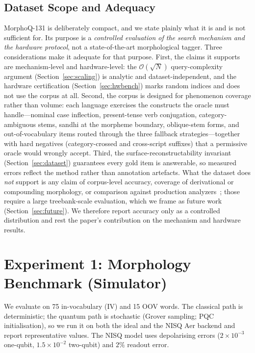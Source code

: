 \documentclass[journal]{IEEEtran}
\newcommand{\bigO}{\mathcal{O}}
\newcommand{\sqrtN}{\sqrt{N}}
\begin{document}
\subsection{Dataset Scope and Adequacy}
\label{sec:adequacy}
MorphoQ-131 is deliberately compact, and we state plainly what it is and is not
sufficient for. Its purpose is a \emph{controlled evaluation of the search
mechanism and the hardware protocol}, not a state-of-the-art morphological
tagger. Three considerations make it adequate for that purpose.
First, the claims it supports are mechanism-level and hardware-level: the
$\bigO(\sqrtN)$ query-complexity argument (Section~\ref{sec:scaling}) is
analytic and dataset-independent, and the hardware certification
(Section~\ref{sec:hwbench}) marks random indices and does not use the corpus at
all. Second, the corpus is designed for phenomenon coverage rather than volume:
each language exercises the constructs the oracle must handle---nominal case
inflection, present-tense verb conjugation, category-ambiguous stems, sandhi at
the morpheme boundary, oblique-stem forms, and out-of-vocabulary items routed
through the three fallback strategies---together with hard negatives
(category-crossed and cross-script suffixes) that a permissive oracle would
wrongly accept. Third, the surface-reconstructability invariant
(Section~\ref{sec:dataset}) guarantees every gold item is answerable, so
measured errors reflect the method rather than annotation artefacts. What the
dataset does \emph{not} support is any claim of corpus-level accuracy, coverage
of derivational or compounding morphology, or comparison against production
analyzers~\cite{jha2009,bapat2010,huet2005}; those require a large treebank-scale
evaluation, which we frame as future work (Section~\ref{sec:future}). We
therefore report accuracy only as a controlled distribution and rest the
paper's contribution on the mechanism and hardware results.

\section{Experiment 1: Morphology Benchmark (Simulator)}
\label{sec:morphbench}
We evaluate on 75 in-vocabulary (IV) and 15 OOV words. The classical path is
deterministic; the quantum path is stochastic (Grover sampling; PQC
initialisation), so we run it on both the ideal and the NISQ Aer backend and
report representative values. The NISQ model uses depolarising errors
($2\times10^{-3}$ one-qubit, $1.5\times10^{-2}$ two-qubit) and $2\%$ readout
error.
\end{document}
